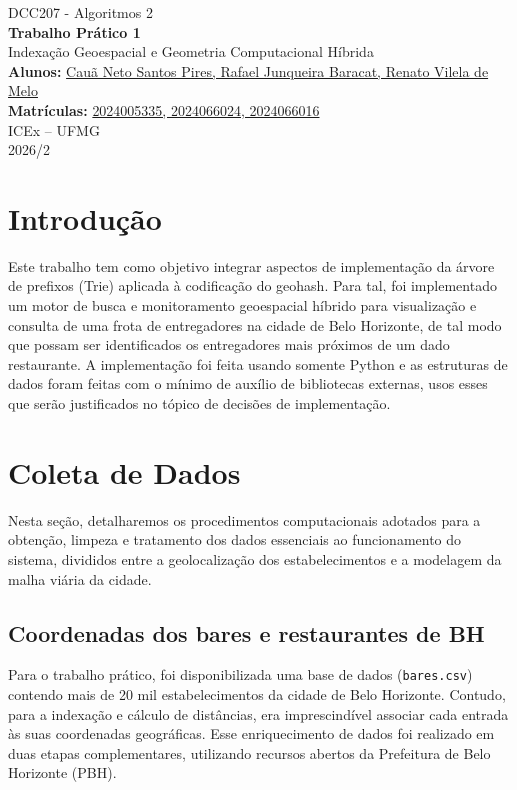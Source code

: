 \documentclass[12pt,a4paper]{article}
\begin{document}
\begin{titlepage}
    \centering
    {\Large DCC207 - Algoritmos 2}\\[1.5cm]
    {\Huge \textbf{Trabalho Prático 1}}\\[0.5cm]
    {\LARGE Indexação Geoespacial e Geometria Computacional Híbrida}\\[2cm]
    
    \vfill
    \textbf{Alunos:} \underline{Cauã Neto Santos Pires, Rafael Junqueira Baracat, Renato Vilela de Melo} \\[0.5cm]
    \textbf{Matrículas:} \underline{2024005335, 2024066024, 2024066016} \\[3cm]
    
    {\large ICEx – UFMG \\ 2026/2}
\end{titlepage}

\tableofcontents
\newpage

\section{Introdução}
Este trabalho tem como objetivo integrar aspectos de implementação da árvore de prefixos (Trie) aplicada à codificação do geohash.
Para tal, foi implementado um motor de busca e monitoramento geoespacial híbrido para visualização e consulta de uma frota de entregadores na cidade de Belo Horizonte,
de tal modo que possam ser identificados os entregadores mais próximos de um dado restaurante. A implementação foi feita usando somente Python e as estruturas de dados foram feitas
com o mínimo de auxílio de bibliotecas externas, usos esses que serão justificados no tópico de decisões de implementação.

\section{Coleta de Dados}
Nesta seção, detalharemos os procedimentos computacionais adotados para a obtenção, limpeza e tratamento dos dados essenciais ao funcionamento do sistema, divididos entre a geolocalização dos estabelecimentos e a modelagem da malha viária da cidade.

\subsection{Coordenadas dos bares e restaurantes de BH}
Para o trabalho prático, foi disponibilizada uma base de dados (\texttt{bares.csv}) contendo mais de 20 mil estabelecimentos da cidade de Belo Horizonte. Contudo, para a indexação e cálculo de distâncias, era imprescindível associar cada entrada às suas coordenadas geográficas. Esse enriquecimento de dados foi realizado em duas etapas complementares, utilizando recursos abertos da Prefeitura de Belo Horizonte (PBH). 
\end{document}

